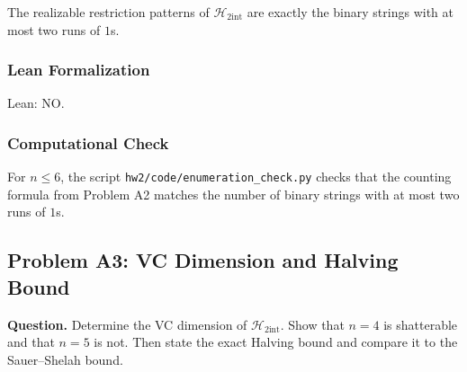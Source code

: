\documentclass{article}
\newcommand{\classA}{\mathcal{H}_{2\mathrm{int}}}
\begin{document}
\begin{solutionbox}
The realizable restriction patterns of \(\classA\) are exactly the binary
strings with at most two runs of \(1\)s.

\subsubsection{Lean Formalization}

Lean: NO.

\subsubsection{Computational Check}

For \(n\le 6\), the script \texttt{hw2/code/enumeration\_check.py} checks that
the counting formula from Problem A2 matches the number of binary strings with
at most two runs of \(1\)s.

\end{solutionbox}

\subsection{Problem A3: VC Dimension and Halving Bound}

\textbf{Question.}
\newline
Determine the VC dimension of \(\classA\). Show that \(n=4\) is shatterable and
that \(n=5\) is not. Then state the exact Halving bound and compare it to the
Sauer--Shelah bound.
\end{document}
